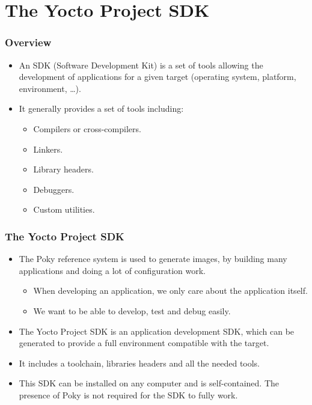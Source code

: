 \section{The Yocto Project SDK}

\begin{frame}
  \frametitle{Overview}
  \begin{itemize}
    \item An SDK (Software Development Kit) is a set of tools allowing
      the development of applications for a given target (operating
      system, platform, environment, \dots).
    \item It generally provides a set of tools including:
      \begin{itemize}
        \item Compilers or cross-compilers.
        \item Linkers.
        \item Library headers.
        \item Debuggers.
        \item Custom utilities.
      \end{itemize}
  \end{itemize}
\end{frame}

\begin{frame}
  \frametitle{The Yocto Project SDK}
  \begin{itemize}
    \item The Poky reference system is used to generate images, by
      building many applications and doing a lot of configuration work.
      \begin{itemize}
        \item When developing an application, we only care about the
          application itself.
        \item We want to be able to develop, test and debug easily.
      \end{itemize}
    \item The Yocto Project SDK is an application development SDK,
      which can be generated to provide a full environment compatible
      with the target.
    \item It includes a toolchain, libraries headers and all the
      needed tools.
    \item This SDK can be installed on any computer and is
      self-contained. The presence of Poky is not required for the SDK
      to fully work.
  \end{itemize}
\end{frame}

